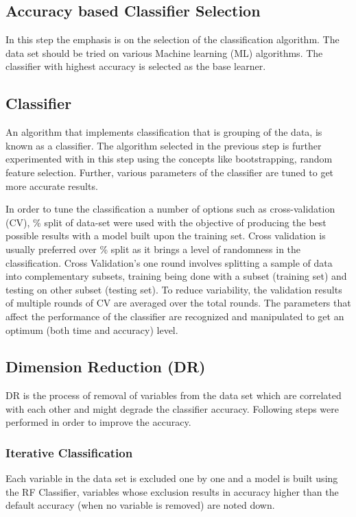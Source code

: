 \documentclass{llncs}
\begin{document}
\subsection{Accuracy based Classifier Selection}
In this step the emphasis is on the selection of the classification algorithm. The data set should be tried on various Machine learning (ML) algorithms. The classifier with highest accuracy is selected as the base learner.

\subsection{Classifier}
An algorithm that implements classification that is grouping of the data, is known as a classifier. The algorithm selected in the previous step is further experimented with in this step using the concepts like bootstrapping, random feature selection. Further, various parameters of the classifier are tuned to get more accurate results.

In order to tune the classification a number of options such as cross-validation (CV), \% split of data-set were used with the objective of producing the best possible results with a model built upon the training set. Cross validation is usually preferred over \% split as it brings a level of randomness in the classification. Cross Validation's one round involves splitting a sample of data into complementary subsets, training being done with a subset (training set) and testing  on other subset (testing set). To reduce variability, the validation results of multiple rounds of CV are averaged over the total rounds. The parameters that affect the performance of the classifier are recognized and manipulated to get an optimum (both time and accuracy) level.

\subsection{Dimension Reduction (DR)}
DR is the process of removal of variables from the data set which are correlated with each other and might degrade the classifier accuracy. Following steps were performed in order to improve the accuracy.

\subsubsection{Iterative Classification}

Each variable in the data set is excluded one by one and a model is built using the RF Classifier, variables whose exclusion results in accuracy higher than the default accuracy (when no variable is removed) are noted down.
\end{document}
